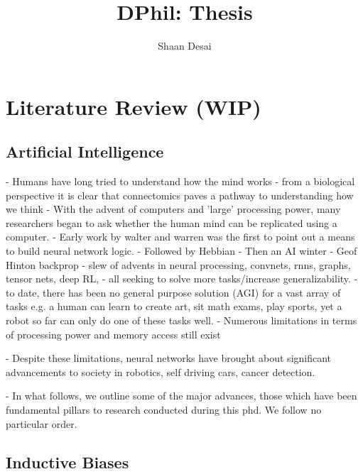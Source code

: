 \documentclass{article}
\title{DPhil: Thesis}
\author{Shaan Desai }
\begin{document}
\maketitle



\tableofcontents


\section{Literature Review (WIP)}

\subsection{Artificial Intelligence}

- Humans have long tried to understand how the mind works
- from a biological perspective it is clear that connectomics paves a pathway to understanding how we think
- With the advent of computers and 'large' processing power, many researchers began to ask whether the human mind can be replicated using a computer.
- Early work by walter and warren was the first to point out a means to build neural network logic.
- Followed by Hebbian
- Then an AI winter
- Geof Hinton backprop
- slew of advents in neural processing, convnets, rnns, graphs, tensor nets, deep RL, 
- all seeking to solve more tasks/increase generalizability.
- to date, there has been no general purpose solution (AGI) for a vast array of tasks e.g. a human can learn to create art, sit math exams, play sports, yet a robot so far can only do one of these tasks well.
- Numerous limitations in terms of processing power and memory access still exist

- Despite these limitations, neural networks have brought about significant advancements to society in robotics, self driving cars, cancer detection.

- In what follows, we outline some of the major advances, those which have been fundamental pillars to research conducted during this phd. We follow no particular order.

\subsection{Inductive Biases}
\end{document}
